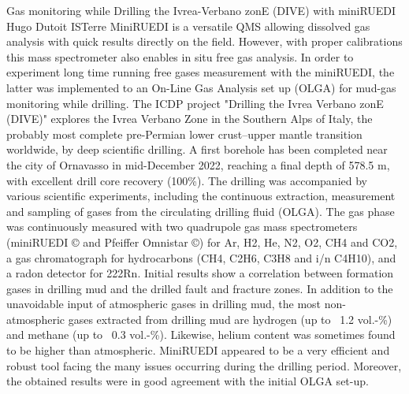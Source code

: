 \begin{conf-abstract}
{Gas monitoring while Drilling the Ivrea-Verbano zonE (DIVE) with miniRUEDI}
{Hugo Dutoit}
{ISTerre}
{MiniRUEDI is a versatile QMS allowing dissolved gas analysis with quick results directly on the field. However, with proper calibrations this mass spectrometer also enables in situ free gas analysis. In order to experiment long time running free gases measurement with the miniRUEDI, the latter was implemented to an On-Line Gas Analysis set up (OLGA) for mud-gas monitoring while drilling. The ICDP project "Drilling the Ivrea Verbano zonE (DIVE)" explores the Ivrea Verbano Zone in the Southern Alps of Italy, the probably most complete pre-Permian lower crust–upper mantle transition worldwide, by deep scientific drilling. A first borehole has been completed near the city of Ornavasso in mid-December 2022, reaching a final depth of 578.5 m, with excellent drill core recovery (100\%). The drilling was accompanied by various scientific experiments, including the continuous extraction, measurement and sampling of gases from the circulating drilling fluid (OLGA). The gas phase was continuously measured with two quadrupole gas mass spectrometers (miniRUEDI © and Pfeiffer Omnistar ©) for Ar, H2, He, N2, O2, CH4 and CO2, a gas chromatograph for hydrocarbons (CH4, C2H6, C3H8 and i/n C4H10), and a radon detector for 222Rn. Initial results show a correlation between formation gases in drilling mud and the drilled fault and fracture zones. In addition to the unavoidable input of atmospheric gases in drilling mud, the most non-atmospheric gases extracted from drilling mud are hydrogen (up to ~1.2 vol.-\%) and methane (up to ~0.3 vol.-\%). Likewise, helium content was sometimes found to be higher than atmospheric. MiniRUEDI appeared to be a very efficient and robust tool facing the many issues occurring during the drilling period. Moreover, the obtained results were in good agreement with the initial OLGA set-up.}
\end{conf-abstract}
